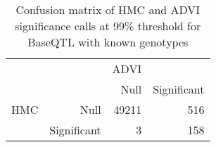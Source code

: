 \begin{table}[ht]
\centering
\caption{Confusion matrix of HMC and ADVI significance calls at 99\% threshold for BaseQTL with known genotypes} 
\label{tab:GT-xtab-99}
\begin{tabular}{rr|rr}
   &  & ADVI &  \\ 
    &   & Null & Significant \\ 
   \hline
HMC & Null & 49211 & 516 \\ 
    & Significant & 3 & 158 \\ 
  \end{tabular}
\end{table}
